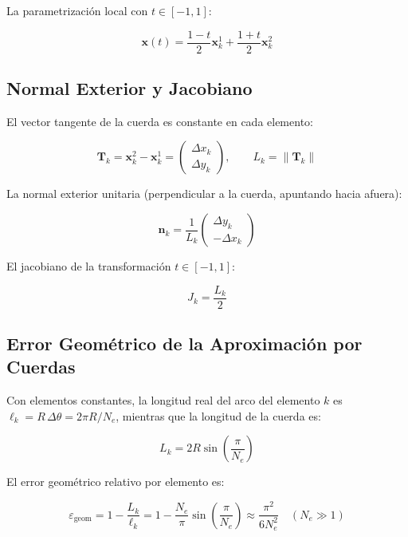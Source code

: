 \documentclass[12pt,a4paper]{article}
\begin{document}
La parametrización local con $t\in[-1,1]$:

\begin{equation}
    \mathbf{x}(t) = \frac{1-t}{2}\mathbf{x}_k^1 + \frac{1+t}{2}\mathbf{x}_k^2
\end{equation}

\subsection{Normal Exterior y Jacobiano}

El vector tangente de la cuerda es constante en cada elemento:

\begin{equation}
    \mathbf{T}_k = \mathbf{x}_k^2 - \mathbf{x}_k^1
    = \begin{pmatrix} \Delta x_k \\ \Delta y_k \end{pmatrix},
    \qquad L_k = \|\mathbf{T}_k\|
\end{equation}

La normal exterior unitaria (perpendicular a la cuerda, apuntando hacia afuera):

\begin{equation}
    \mathbf{n}_k = \frac{1}{L_k}
    \begin{pmatrix} \Delta y_k \\ -\Delta x_k \end{pmatrix}
\end{equation}

El jacobiano de la transformación $t\in[-1,1]$:

\begin{equation}
    J_k = \frac{L_k}{2}
\end{equation}

\subsection{Error Geométrico de la Aproximación por Cuerdas}

Con elementos constantes, la longitud real del arco del elemento $k$ es
$\ell_k = R\,\Delta\theta = 2\pi R/N_e$, mientras que la longitud de la
cuerda es:

\begin{equation}
    L_k = 2R\sin\!\left(\frac{\pi}{N_e}\right)
\end{equation}

El error geométrico relativo por elemento es:

\begin{equation}
    \varepsilon_{\text{geom}} = 1 - \frac{L_k}{\ell_k}
    = 1 - \frac{N_e}{\pi}\sin\!\left(\frac{\pi}{N_e}\right)
    \approx \frac{\pi^2}{6N_e^2} \quad (N_e \gg 1)
\end{equation}
\end{document}
